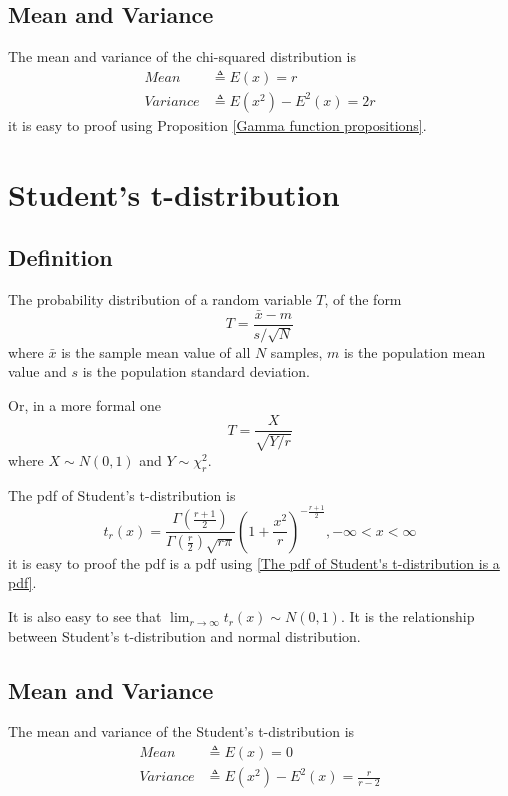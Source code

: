 \documentclass[a4paper]{article}
\begin{document}
\subsection{Mean and Variance}
The mean and variance of the chi-squared distribution is
\begin{equation*}
    \begin{aligned}
        Mean     & \triangleq E(x) = r             \\
        Variance & \triangleq E(x^2) - E^2(x) = 2r
    \end{aligned}
\end{equation*}
it is easy to proof using Proposition \ref{Gamma function propositions}.

\section{Student's t-distribution}
\subsection{Definition}
The probability distribution of a random variable $T$, of the form
\begin{equation*}
    T = \frac{\bar{x} - m}{s / \sqrt{N}}
\end{equation*}
where $\bar{x}$ is the sample mean value of all $N$ samples, $m$ is the population mean value and $s$ is the population standard deviation.

Or, in a more formal one
\begin{equation}
    T = \frac{X}{\sqrt{Y/r}}
\end{equation}
where $X \sim N(0, 1)$ and $Y \sim \chi_r^2$.

The pdf of Student's t-distribution is
\begin{equation}
    t_r(x) = \frac{\Gamma(\frac{r+1}{2})}{\Gamma(\frac{r}{2}) \sqrt{r\pi}} (1+\frac{x^2}{r})^{-\frac{r+1}{2}}, -\infty < x < \infty
\end{equation}
it is easy to proof the pdf is a pdf using \ref{The pdf of Student's t-distribution is a pdf}.

It is also easy to see that $\lim_{r \to \infty} t_r(x) \sim N(0, 1)$.
It is the relationship between Student's t-distribution and normal distribution.

\subsection{Mean and Variance}
The mean and variance of the Student's t-distribution is
\begin{equation*}
    \begin{aligned}
        Mean     & \triangleq E(x) = 0                        \\
        Variance & \triangleq E(x^2) - E^2(x) = \frac{r}{r-2}
    \end{aligned}
\end{equation*}
\end{document}
